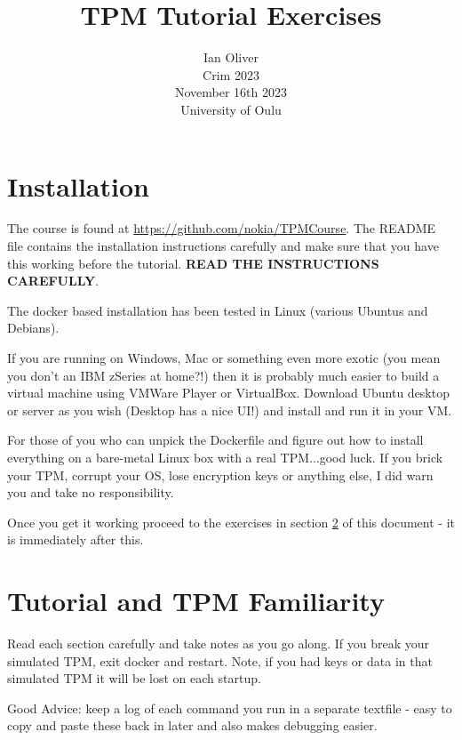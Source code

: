 \documentclass[11pt,a4paper]{article}
\begin{document}
\title{TPM Tutorial Exercises}
\author{Ian Oliver\\Crim 2023\\November 16th 2023\\University of Oulu}
\maketitle

\tableofcontents


\section{Installation}
The course is found at \url{https://github.com/nokia/TPMCourse}. The README file contains the installation instructions carefully and make sure that you have this working before the tutorial. \textbf{READ THE INSTRUCTIONS CAREFULLY}.

The docker based installation has been tested in Linux (various Ubuntus and Debians).

If you are running on Windows, Mac or something even more exotic (you mean you don't an IBM zSeries at home?!) then it is probably much easier to build a virtual machine using VMWare Player or VirtualBox. Download Ubuntu desktop or server as you wish (Desktop has a nice UI!) and install and run it in your VM.

For those of you who can unpick the Dockerfile and figure out how to install everything on a bare-metal Linux box with a real TPM...good luck. If you brick your TPM, corrupt your OS, lose encryption keys or anything else, I did warn you and take no responsibility.

Once you get it working proceed to the exercises in section \ref{theexercises} of this document - it is immediately after this.



\section{Tutorial and TPM Familiarity}\label{theexercises}
Read each section carefully and take notes as you go along. If you break your simulated TPM, exit docker and restart. Note, if you had keys or data in that simulated TPM it will be lost on each startup.

Good Advice: keep a log of each command you run in a separate textfile - easy to copy and paste these back in later and also makes debugging easier.
\end{document}
